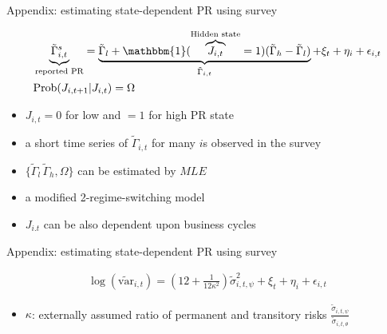 \documentclass{beamer}
\begin{document}
\begin{frame}{Appendix: estimating state-dependent PR using survey}
	\label{RegimeEstimation}
	
	\begin{equation*}
		\begin{split}
			&	\underbrace{\tilde \Gamma^s_{i,t}}_{\text{reported PR}} = \underbrace{\tilde \Gamma_l + \mathbbm{1}(\overbrace{J_{i,t}}^{\text{Hidden state}}= 1)( \tilde \Gamma_h -\tilde \Gamma_l)}_{\tilde \Gamma_{i,t}} +\xi_{t}+\eta_{i}+ \epsilon_{i,t}\\
			& \text{Prob}(J_{i,t+1}|J_{i,t}) = \Omega
		\end{split}
	\end{equation*}
	
	\begin{itemize}
		
		\item $J_{i,t} =0$ for low and $=1$ for high PR state
		\item a short time series of $\tilde \Gamma_ {i,t}$ for many $i$s observed in the survey 
		\item $\{\tilde \Gamma_l\,\tilde \Gamma_h,\Omega\}$ can be estimated by $MLE$
		\item a modified \cite{hamilton1989new} 2-regime-switching model 
		\item $J_{i.t}$ can be also dependent upon business cycles 
	\end{itemize}
	\hyperlink{appendix:RegimeEstimationDetail}{} 
\end{frame}


\begin{frame}{Appendix: estimating state-dependent PR using survey}
	\label{appendix:RegimeEstimationDetail}
	
	\begin{equation*}
		\begin{split}
				\log(\tilde {\text{var}}_{i,t})= (12+\frac{1}{12\kappa^2})\tilde \sigma^2_{i,t,\psi} + \xi_{t}+\eta_{i}+ \epsilon_{i,t}
			\end{split}
	\end{equation*}
	\begin{itemize}
		
		\item $\kappa$: externally assumed ratio of permanent and transitory risks $\frac{\tilde \sigma_{i,t,\psi}}{\tilde \sigma_{i,t,\theta}}$
		\end{itemize}
	\hyperlink{RegimeEstimation}{} 
\end{frame}
\end{document}
